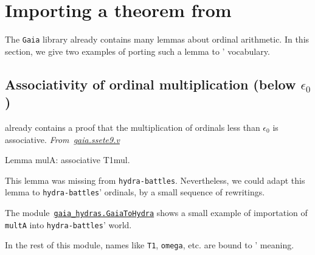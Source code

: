  







\section{Importing a theorem from \gaia}
\label{sect:gaia2hydra}

The \texttt{Gaia} library already contains many lemmas about
ordinal arithmetic. In this section, we give two examples of
porting such a lemma to \HydrasLib' vocabulary.

\subsection{Associativity of ordinal multiplication (below \texorpdfstring{$\epsilon_0$}{epsilon\_0})}
\gaia already contains a proof that the multiplication of ordinals less than $\epsilon_0$ is associative.
\emph{From~\href{https://github.com/coq-community/gaia/blob/master/theories/ssete9.v}{gaia.ssete9.v}}

\begin{Coqsrc}
Lemma mulA: associative T1mul.
\end{Coqsrc}

This lemma was missing from \texttt{hydra-battles}. Nevertheless, we could adapt this lemma to \texttt{hydra-battles}' ordinals, by a small sequence of rewritings.


The module~\href{../theories/html/gaia_hydras.GaiaToHydra.html}%
{\texttt{gaia\_hydras.GaiaToHydra}} shows a small
example of importation of \texttt{multA} into \texttt{hydra-battles}' world.


In the rest of this module, names like  \texttt{T1}, \texttt{omega}, etc. are  bound to \HydrasLib' meaning.


